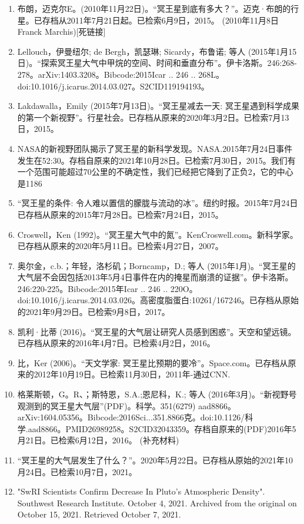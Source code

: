 \begin{enumerate}
\item 布朗，迈克尔E。(2010年11月22日)。“冥王星到底有多大？”。迈克·布朗的行星。已存档从2011年7月21日起。已检索6月9日，2015。 (2010年11月8日Franck Marchis)[死链接]
\item Lellouch，伊曼纽尔; de Bergh，凯瑟琳; Sicardy，布鲁诺; 等人 (2015年1月15日)。“探索冥王星大气中甲烷的空间、时间和垂直分布”。伊卡洛斯。246:268-278。arXiv:1403.3208。Bibcode:2015Icar .. 246 .. 268L。doi:10.1016/j.icarus.2014.03.027。S2CID119194193。 
\item Lakdawalla，Emily (2015年7月13日)。“冥王星减去一天: 冥王星遇到科学成果的第一个新视野”。行星社会。已存档从原来的2020年3月2日。已检索7月13日，2015。
\item NASA的新视野团队揭示了冥王星的新科学发现。NASA.2015年7月24日事件发生在52:30。存档自原来的2021年10月28日。已检索7月30日，2015。我们有一个范围可能超过70公里的不确定性，我们已经把它降到了正负2，它的中心是1186
\item “冥王星的条件: 令人难以置信的朦胧与流动的冰”。纽约时报。2015年7月24日已存档从原来的2015年7月28日。已检索7月24日，2015。
\item Croswell，Ken (1992)。“冥王星大气中的氮”。KenCroswell.com。新科学家。已存档从原来的2020年5月11日。已检索4月27日，2007。
\item 奥尔金，c.b.；年轻，洛杉矶；Borncamp，D.; 等人 (2015年1月)。“冥王星的大气层不会因包括2013年5月4日事件在内的掩星而崩溃的证据”。伊卡洛斯。246:220-225。Bibcode:2015年Icar .. 246 .. 220O。doi:10.1016/j.icarus.2014.03.026。高密度脂蛋白:10261/167246。已存档从原始的2021年9月29日。已检索9月8日，2017。
\item 凯利·比蒂 (2016)。“冥王星的大气层让研究人员感到困惑”。天空和望远镜。已存档从原来的2016年4月7日。已检索4月2日，2016。
\item 比，Ker (2006)。“天文学家: 冥王星比预期的要冷”。Space.com。已存档从原来的2012年10月19日。已检索11月30日，2011年-通过CNN.
\item 格莱斯顿，G。R、；斯特恩，S.A.;恩尼科，K.; 等人 (2016年3月)。“新视野号观测到的冥王星大气层”(PDF)。科学。351(6279) aad8866。arXiv:1604.05356。Bibcode:2016Sci...351.8866克。doi:10.1126/科学.aad8866。PMID26989258。S2CID32043359。存档自原来的(PDF)2016年5月21日。已检索6月12日，2016。    (补充材料)
\item “冥王星的大气层发生了什么？”。2020年5月22日。已存档从原始的2021年10月24日。已检索10月7日，2021。
\item "SwRI Scientists Confirm Decrease In Pluto's Atmospheric Density". Southwest Research Institute. October 4, 2021. Archived from the original on October 15, 2021. Retrieved October 7, 2021.

\end{enumerate}
